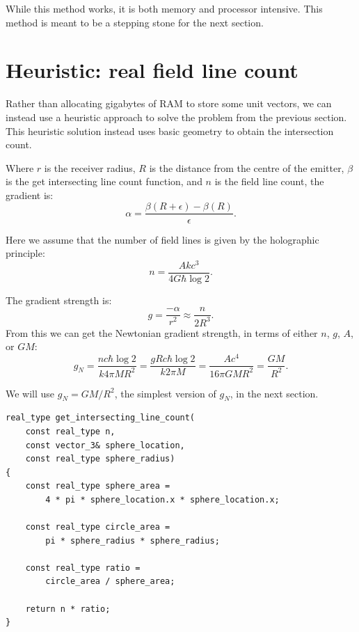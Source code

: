 \documentclass[12pt]{article}
\begin{document}
While this method works, it is both memory and processor intensive.
This method is meant to be a stepping stone for the next section.







\section{Heuristic: real field line count}

Rather than allocating gigabytes of RAM to store some unit vectors, we can instead use a heuristic approach to solve the problem from the previous section.
This heuristic solution instead uses basic geometry to obtain the intersection count.

Where $r$ is the receiver radius, $R$ is the distance from the centre of the emitter, $\beta$ is the get intersecting line count function, and $n$ is the field line count, the gradient is:
\begin{equation}
\alpha = \frac{\beta(R + \epsilon) - \beta(R)}{\epsilon}.
\end{equation}

Here we assume that the number of field lines is given by the holographic principle:
\begin{equation}
n = \frac{A k c^3}{ 4 G \hbar \log 2}.
\end{equation}

The gradient strength is:
\begin{equation}
g = \frac{-\alpha}{r^2} \approx \frac{n}{2 R^3}.
\end{equation}
From this we can get the Newtonian gradient strength, in terms of either $n$, $g$, $A$, or $G M$:
\begin{equation}
\label{g_N_equation}
g_N = \frac{n c \hbar \log 2}{k 4 \pi M R^2} = \frac{g R c \hbar \log 2}{k 2 \pi M} = \frac{A c^4}{16 \pi G M R^2} = \frac{G M}{R^2}.
\end{equation}

We will use $g_N = {G M}/{R^2}$, the simplest version of $g_N$, in the next section.

\begin{lstlisting}
real_type get_intersecting_line_count(
	const real_type n,
	const vector_3& sphere_location,
	const real_type sphere_radius)
{
	const real_type sphere_area = 
		4 * pi * sphere_location.x * sphere_location.x;

	const real_type circle_area = 
		pi * sphere_radius * sphere_radius;
	
	const real_type ratio = 
		circle_area / sphere_area;
	
	return n * ratio;
}
\end{lstlisting}
\end{document}
